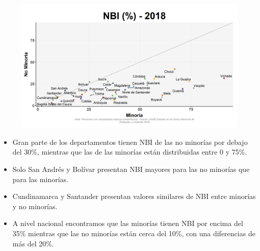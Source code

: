     \begin{figure}[H]
        \caption[Necesidades Básicas Insatisfechas - Minorías VS no minorías ]{\label{nbi_minorias_vs} }
        \begin{center}
        \includegraphics[width=\textwidth,keepaspectratio]{img/var_272_scatter.png}
        \end{center}
    \end{figure}
            \begin{itemize}
                    \item Gran parte de los departamentos tienen NBI de las no minorías por debajo del 30\%, mientras que las de las minorías están distribuidas entre 0 y 75\%. 
                    \item Solo San Andrés y Bolívar presentan NBI mayores para las no minorías que para las minorías.
                    \item Cundinamarca y Santander presentan valores similares de NBI entre minorías y no minorías.
                    \item A nivel nacional encontramos que las minorías tienen NBI por encima del 35\% mientras que las no minorías están cerca del 10\%, con una diferencias de más del 20\%.
                    \end{itemize}

